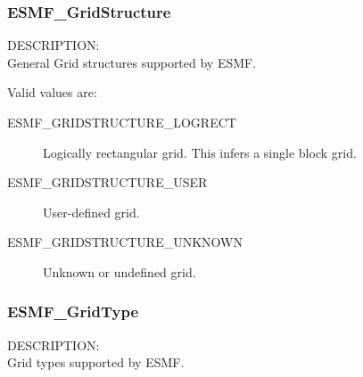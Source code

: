 
\subsubsection{ESMF\_GridStructure}

{\sf DESCRIPTION:\\}
General Grid structures supported by ESMF.

Valid values are:
\begin{description}
   \item [ESMF\_GRIDSTRUCTURE\_LOGRECT]
         Logically rectangular grid.  This infers a single block grid.

   \item [ESMF\_GRIDSTRUCTURE\_USER]
         User-defined grid.

   \item [ESMF\_GRIDSTRUCTURE\_UNKNOWN]
         Unknown or undefined grid.
\end{description}


\subsubsection{ESMF\_GridType}

{\sf DESCRIPTION:\\}
Grid types supported by ESMF.

